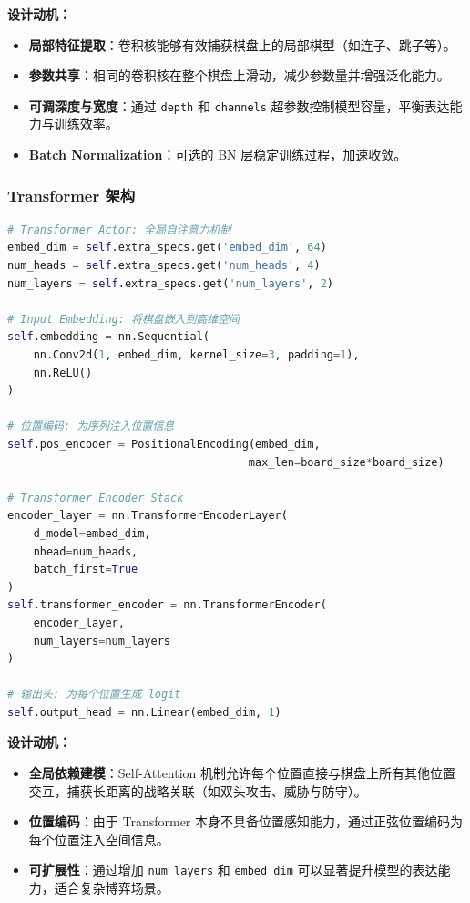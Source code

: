 \documentclass[oneside]{ctexbook}
\begin{document}
\textbf{设计动机：}
\begin{itemize}
    \item \textbf{局部特征提取}：卷积核能够有效捕获棋盘上的局部棋型（如连子、跳子等）。
    \item \textbf{参数共享}：相同的卷积核在整个棋盘上滑动，减少参数量并增强泛化能力。
    \item \textbf{可调深度与宽度}：通过 \texttt{depth} 和 \texttt{channels} 超参数控制模型容量，平衡表达能力与训练效率。
    \item \textbf{Batch Normalization}：可选的 BN 层稳定训练过程，加速收敛。
\end{itemize}

\subsubsection{Transformer 架构}

\begin{lstlisting}[language=Python]
# Transformer Actor: 全局自注意力机制
embed_dim = self.extra_specs.get('embed_dim', 64)
num_heads = self.extra_specs.get('num_heads', 4)
num_layers = self.extra_specs.get('num_layers', 2)

# Input Embedding: 将棋盘嵌入到高维空间
self.embedding = nn.Sequential(
    nn.Conv2d(1, embed_dim, kernel_size=3, padding=1),
    nn.ReLU()
)

# 位置编码: 为序列注入位置信息
self.pos_encoder = PositionalEncoding(embed_dim, 
                                     max_len=board_size*board_size)

# Transformer Encoder Stack
encoder_layer = nn.TransformerEncoderLayer(
    d_model=embed_dim, 
    nhead=num_heads, 
    batch_first=True
)
self.transformer_encoder = nn.TransformerEncoder(
    encoder_layer, 
    num_layers=num_layers
)

# 输出头: 为每个位置生成 logit
self.output_head = nn.Linear(embed_dim, 1)
\end{lstlisting}

\textbf{设计动机：}
\begin{itemize}
    \item \textbf{全局依赖建模}：Self-Attention 机制允许每个位置直接与棋盘上所有其他位置交互，捕获长距离的战略关联（如双头攻击、威胁与防守）。
    \item \textbf{位置编码}：由于 Transformer 本身不具备位置感知能力，通过正弦位置编码为每个位置注入空间信息。
    \item \textbf{可扩展性}：通过增加 \texttt{num\_layers} 和 \texttt{embed\_dim} 可以显著提升模型的表达能力，适合复杂博弈场景。
\end{itemize}
\end{document}
